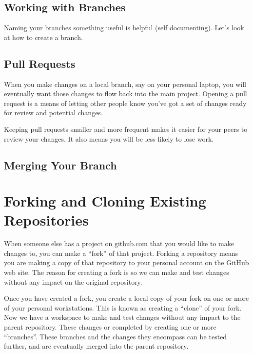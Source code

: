 \subsection{Working with Branches}

\justifying
Naming your branches something useful is helpful (self documenting). Let's look at how to create a branch.

\subsection{Pull Requests}

\justifying
When you make changes on a local branch, say on your personal laptop, you will eventually want those changes
to flow back into the main project. Opening a pull request is a means of letting other
people know you've got a set of changes ready for review and potential changes.

\justifying
Keeping pull requests smaller and more frequent makes it easier for your
peers to review your changes. It also means you will be less likely to lose work.

\subsection{Merging Your Branch}


\section{Forking and Cloning Existing Repositories}

\justifying
When someone else has a project on github.com that you would like to make changes to, you can make a ``fork'' of that project.
Forking a repository means you are making a copy of that repository to your personal account on the GitHub web
site. The reason for creating a fork is so we can make and test changes without any impact on the original repository.

\justifying
Once you have created a fork, you create a local copy of your fork on one or more of your personal workstations. This is
known as creating a ``clone''  of your fork. Now we have a workspace to make and test changes without
any impact to the parent repository. These changes or completed by creating one or more ``branches''. These branches and the
changes they encompass can be tested further, and are eventually merged into the parent repository.

